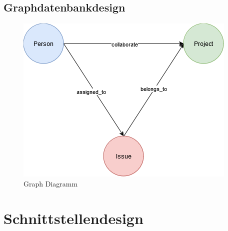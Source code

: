 \subsection{Graphdatenbankdesign} %
\label{sec:graphsdatenbankdesign}
\begin{figure}[H]
	\centering
	\includegraphics[scale=.8]{Illustrations/graph_diagram}
	\caption{Graph Diagramm}
\end{figure}


\section{Schnittstellendesign} %
\label{sec:schnittstellendesign}




